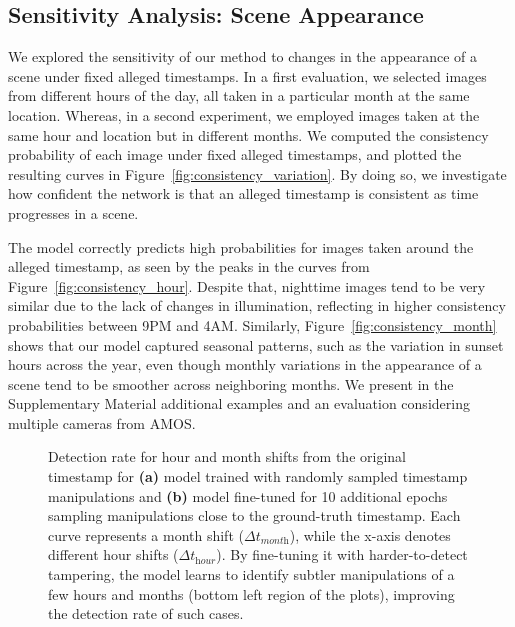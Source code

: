 \documentclass[journal]{IEEEtran}
\begin{document}
    \subsection{Sensitivity Analysis: Scene Appearance}\label{sec:sensitivity_image}
        We explored the sensitivity of our method to changes in the appearance of a scene under fixed alleged timestamps. In a first evaluation, we selected images from different hours of the day, all taken in a particular month at the same location. Whereas, in a second experiment, we employed images taken at the same hour and location but in different months. We computed the consistency probability of each image under fixed alleged timestamps, and plotted the resulting curves in Figure~\ref{fig:consistency_variation}. By doing so, we investigate how confident the network is that an alleged timestamp is consistent as time progresses in a scene.
        
        The model correctly predicts high probabilities for images taken around the alleged timestamp, as seen by the peaks in the curves from Figure~\ref{fig:consistency_hour}. Despite that, nighttime images tend to be very similar due to the lack of changes in illumination, reflecting in higher consistency probabilities between 9PM and 4AM. Similarly, Figure~\ref{fig:consistency_month} shows that our model captured seasonal patterns, such as the variation in sunset hours across the year, even though monthly variations in the appearance of a scene tend to be smoother across neighboring months. We present in the Supplementary Material additional examples and an evaluation considering multiple cameras from AMOS.
        
    

        \begin{figure*}\centering
            \hfill
            
            \caption{Detection rate for hour and month shifts from the original timestamp for \textbf{(a)} model trained with randomly sampled timestamp manipulations and \textbf{(b)} model fine-tuned for 10 additional epochs sampling manipulations close to the ground-truth timestamp. Each curve represents a month shift ($\Delta t_{\textit{month}}$), while the x-axis denotes different hour shifts ($\Delta t_{\textit{hour}}$). By fine-tuning it with harder-to-detect tampering, the model learns to identify subtler manipulations of a few hours and months (bottom left region of the plots), improving the detection rate of such cases.}
            \label{fig:range_tampering}
        \end{figure*}
        
\end{document}
